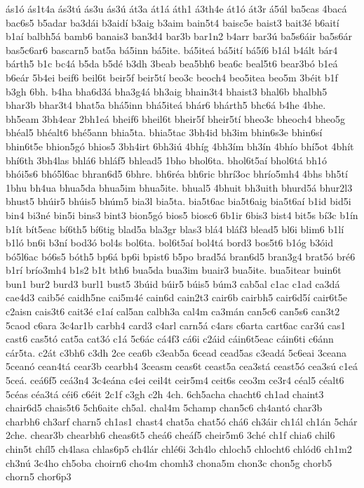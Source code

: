 {ás1ó
ás1t4a
ás3tú
ás3u
ás3ú
át3a
át1á
áth1
á3th4e
át1ó
át3r
á5úl
ba5cas
4bacá
bac6s5
b5adar
ba3dái
b3aidí
b3aig
b3aim
bain5t4
baisc5e
baist3
bait3é
b6aití
b1aí
balbh5á
bamb6
banais3
ban3d4
bar3b
bar1n2
b4arr
bar3ú
ba5s6áir
ba5s6ár
bas5c6ar6
bascarn5
bat5a
bá5inn
bá5ite.
bá5iteá
bá5ití
bá5í6
b1ál
b4ált
bár4
bárth5
b1c
bc4á
b5da
b5dé
b3dh
3beab
bea5bh6
bea6c
beal5t6
bear3bó
b1eá
b6eár
5b4ei
beif6
beil6t
beir5f
beir5tí
beo3c
beoch4
beo5itea
beo5m
3béit
b1f
b3gh
6bh.
b4ha
bha6d3á
bha3g4á
bh3aig
bhain3t4
bhaist3
bhal6b
bhalbh5
bhar3b
bhar3t4
bhat5a
bhá5inn
bhá5iteá
bhár6
bhárth5
bhc6á
b4he
4bhe.
bh5eam
3bh4ear
2bh1eá
bheif6
bheil6t
bheir5f
bheir5tí
bheo3c
bheoch4
bheo5g
bhéal5
bhéalt6
bhé5ann
bhia5ta.
bhia5tac
3bh4id
bh3im
bhin6s3e
bhin6sí
bhin6t5e
bhion5gó
bhios5
3bh4irt
6bh3iú
4bhíg
4bh3ím
bh3ín
4bhío
bhí5ot
4bhít
bhí6th
3bh4las
bhlá6
bhláf5
bhlead5
1bho
bhol6ta.
bhol6t5aí
bhol6tá
bh1ó
bhói5s6
bhó5l6ac
bhran6d5
6bhre.
bh6réa
bh6ric
bhrí3oc
bhrío5mh4
4bhs
bh5tí
1bhu
bh4ua
bhua5da
bhua5im
bhua5ite.
bhual5
4bhuit
bh3uith
bhurd5á
bhur2l3
bhust5
bhúir5
bhúis5
bhúm5
bia3l
bia5ta.
bia5t6ac
bia5t6aig
bia5t6aí
b1id
bid5i
bin4
bi3né
bin5i
bins3
bint3
bion5gó
bios5
biosc6
6b1ir
6bis3
bist4
bit5s
bí3c
b1ín
b1ít
bít5eac
bí6th5
bí6tig
blad5a
bla3gr
blas3
blá4
bláf3
blead5
bl6i
blim6
b1lí
b1ló
bn6i
b3ní
bod3ó
bol4s
bol6ta.
bol6t5aí
bol4tá
bord3
bos5t6
b1óg
b3óid
bó5l6ac
bó6s5
bóth5
bp6á
bp6i
bpist6
b5po
brad5á
bran6d5
bran3g4
brat5ó
bré6
b1rí
brío3mh4
b1s2
b1t
bth6
bua5da
bua3im
buair3
bua5ite.
bua5itear
buin6t
bun1
bur2
burd3
burl1
bust5
3búid
búir5
búis5
búm3
cab5al
c1ac
c1ad
ca3dá
cae4d3
caib5é
caidh5ne
cai5m4é
cain6d
cain2t3
cair6b
cairbh5
cair6d5í
cair6t5e
c2aisn
cais3t6
cait3é
c1aí
cal5an
calbh3a
cal4m
ca3mán
can5c6
can5s6
can3t2
5caod
c6ara
3c4ar1b
carbh4
card3
c4arl
carn5á
c4ars
c6arta
cart6ac
car3ú
cas1
cast6
cas5tó
cat5a
cat3ó
c1á
5c6ác
cá4f3
cá6i
c2áid
cáin6t5eac
cáin6ti
c6ánn
cár5ta.
c2át
c3bh6
c3dh
2ce
cea6b
c3eab5a
6cead
cead5as
c3eadá
5c6eai
3ceana
5ceanó
cean4tá
cear3b
cearbh4
3ceasm
ceas6t
ceast5a
cea3stá
ceast5ó
cea3sú
c1eá
5ceá.
ceá6f5
ceá3n4
3c4eána
c4ei
ceil4t
ceir5m4
ceit6s
ceo3m
ce3r4
céal5
céalt6
5céas
céa3tá
céi6
c6éit
2c1f
c3gh
c2h
4ch.
6ch5acha
chacht6
ch1ad
chaint3
chair6d5
chais5t6
5ch6aite
ch5al.
chal4m
5champ
chan5c6
ch4antó
char3b
charbh6
ch3arf
charn5
ch1as1
chast4
chat5a
chat5ó
chá6
ch3áir
ch1ál
ch1án
5chár
2che.
chear3b
chearbh6
cheas6t5
cheá6
cheáf5
cheir5m6
3ché
ch1f
chia6
chil6
chin5t
chíl5
ch4lasa
chlas6p5
ch4lár
chlé6i
3ch4lo
chloch5
chlocht6
chlód6
ch1m2
ch3nú
3c4ho
ch5oba
choirn6
cho4m
chomh3
chona5m
chon3c
chon5g
chorb5
chorn5
chor6p3
}
